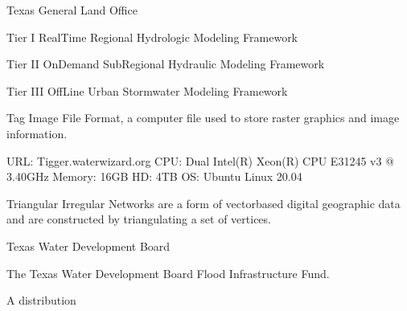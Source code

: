 \documentclass[letterpaper,12pt,english,openany,oneside]{sphinxmanual}
\begin{document}
\begin{description}
\sphinxAtStartPar
Texas General Land Office

\sphinxAtStartPar
Tier I Real\sphinxhyphen{}Time Regional Hydrologic Modeling Framework

\sphinxAtStartPar
Tier II On\sphinxhyphen{}Demand Sub\sphinxhyphen{}Regional Hydraulic Modeling Framework

\sphinxAtStartPar
Tier III Off\sphinxhyphen{}Line Urban Stormwater Modeling Framework

\sphinxAtStartPar
Tag Image File Format, a computer file used to store raster graphics and image information.

\sphinxAtStartPar
URL: Tigger.water\sphinxhyphen{}wizard.org CPU: Dual Intel(R) Xeon(R) CPU E3\sphinxhyphen{}1245 v3 @ 3.40GHz Memory: 16GB HD: 4TB OS: Ubuntu Linux 20.04

\sphinxAtStartPar
Triangular Irregular Networks are a form of vector\sphinxhyphen{}based digital geographic data and are constructed by triangulating a set of vertices.

\sphinxAtStartPar
Texas Water Development Board

\sphinxAtStartPar
The Texas Water Development Board Flood Infrastructure Fund.

\sphinxAtStartPar
A {\hyperref[\detokenize{glossary:term-Linux}]{}} distribution


\end{description}
\end{document}
